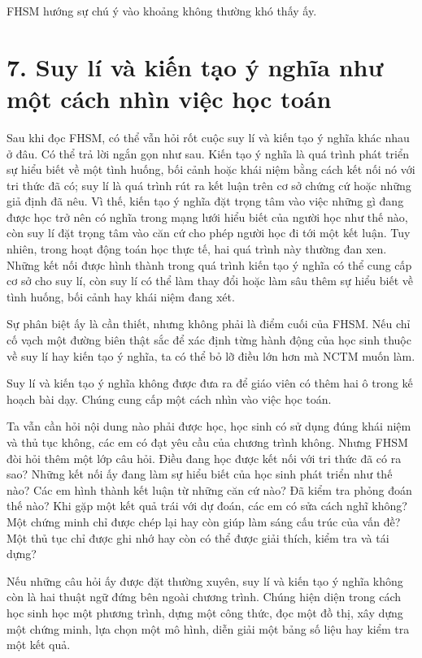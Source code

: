 FHSM hướng sự chú ý vào khoảng không thường khó thấy ấy.

\section*{7. Suy lí và kiến tạo ý nghĩa như một cách nhìn việc học toán}

Sau khi đọc FHSM, có thể vẫn hỏi rốt cuộc suy lí và kiến tạo ý nghĩa khác nhau ở đâu. Có thể trả lời ngắn gọn như sau. Kiến tạo ý nghĩa là quá trình phát triển sự hiểu biết về một tình huống, bối cảnh hoặc khái niệm bằng cách kết nối nó với tri thức đã có; suy lí là quá trình rút ra kết luận trên cơ sở chứng cứ hoặc những giả định đã nêu. Vì thế, kiến tạo ý nghĩa đặt trọng tâm vào việc những gì đang được học trở nên có nghĩa trong mạng lưới hiểu biết của người học như thế nào, còn suy lí đặt trọng tâm vào căn cứ cho phép người học đi tới một kết luận. Tuy nhiên, trong hoạt động toán học thực tế, hai quá trình này thường đan xen. Những kết nối được hình thành trong quá trình kiến tạo ý nghĩa có thể cung cấp cơ sở cho suy lí, còn suy lí có thể làm thay đổi hoặc làm sâu thêm sự hiểu biết về tình huống, bối cảnh hay khái niệm đang xét.

Sự phân biệt ấy là cần thiết, nhưng không phải là điểm cuối của FHSM. Nếu chỉ cố vạch một đường biên thật sắc để xác định từng hành động của học sinh thuộc về suy lí hay kiến tạo ý nghĩa, ta có thể bỏ lỡ điều lớn hơn mà NCTM muốn làm.

Suy lí và kiến tạo ý nghĩa không được đưa ra để giáo viên có thêm hai ô trong kế hoạch bài dạy. Chúng cung cấp một cách nhìn vào việc học toán.

Ta vẫn cần hỏi nội dung nào phải được học, học sinh có sử dụng đúng khái niệm và thủ tục không, các em có đạt yêu cầu của chương trình không. Nhưng FHSM đòi hỏi thêm một lớp câu hỏi. Điều đang học được kết nối với tri thức đã có ra sao? Những kết nối ấy đang làm sự hiểu biết của học sinh phát triển như thế nào? Các em hình thành kết luận từ những căn cứ nào? Đã kiểm tra phỏng đoán thế nào? Khi gặp một kết quả trái với dự đoán, các em có sửa cách nghĩ không? Một chứng minh chỉ được chép lại hay còn giúp làm sáng cấu trúc của vấn đề? Một thủ tục chỉ được ghi nhớ hay còn có thể được giải thích, kiểm tra và tái dựng?

Nếu những câu hỏi ấy được đặt thường xuyên, suy lí và kiến tạo ý nghĩa không còn là hai thuật ngữ đứng bên ngoài chương trình. Chúng hiện diện trong cách học sinh học một phương trình, dựng một công thức, đọc một đồ thị, xây dựng một chứng minh, lựa chọn một mô hình, diễn giải một bảng số liệu hay kiểm tra một kết quả.

